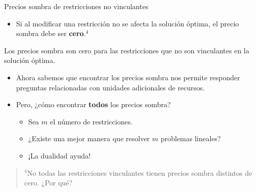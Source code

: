\documentclass{beamer}
\begin{document}
\begin{frame}{Precios sombra de restricciones no vinculantes}
    \begin{itemize}
        \item Si al modificar una restricción no se afecta la solución óptima, el precio sombra debe ser \textbf{cero}.${}^{4}$
    \end{itemize}
    
    \begin{block}{}
        Los precios sombra son cero para las restricciones que no son vinculantes en la solución óptima.
    \end{block}

    \begin{itemize}
        \item Ahora sabemos que encontrar los precios sombra nos permite responder preguntas relacionadas con unidades adicionales de recursos.
    \end{itemize}

    \begin{itemize}
        \item Pero, ¿cómo encontrar \textbf{todos} los precios sombra?
        \begin{itemize}
            \item Sea \( m \) el número de restricciones.
            \item ¿Existe una mejor manera que resolver \( m \) problemas lineales?
            \item ¡La dualidad ayuda!
        \end{itemize}
    \end{itemize}
    
    \vspace{0.5cm}
    \footnotesize{
        \begin{quote}
            ${}^{4}$No todas las restricciones vinculantes tienen precios sombra distintos de cero. ¿Por qué?
        \end{quote}
    }
\end{frame}
\end{document}
